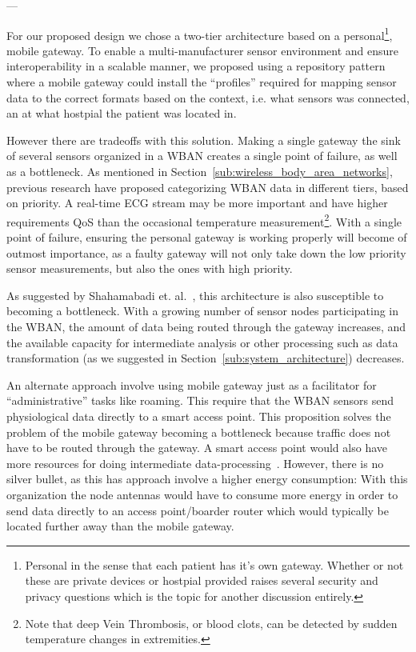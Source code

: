 ---

For our proposed design we chose a two-tier architecture based on a personal\footnote{ Personal in the sense that each patient has it's own gateway. Whether or not these are private devices or hostpial provided raises several security and privacy questions which is the topic for another discussion entirely.}, mobile gateway. To enable a multi-manufacturer sensor environment and ensure interoperability in a scalable manner, we proposed using a repository pattern where a mobile gateway could install the ``profiles'' required for mapping sensor data to the correct formats based on the context, i.e. what sensors was connected, an at what hostpial the patient was located in. 

However there are tradeoffs with this solution. Making a single gateway the sink of several sensors organized in a WBAN creates a single point of failure, as well as a bottleneck. As mentioned in Section~\ref{sub:wireless_body_area_networks}, previous research have proposed categorizing WBAN data in different tiers, based on priority. A real-time ECG stream may be more important and have higher requirements QoS than the occasional temperature measurement\footnote{ Note that deep Vein Thrombosis, or blood clots, can be detected by sudden temperature changes in extremities.}.  With a single point of failure, ensuring the personal gateway is working properly will become of outmost importance, as a faulty gateway will not only take down the low priority sensor measurements, but also the ones with high priority. 

As suggested by Shahamabadi et. al.~\cite{Shahamabadi:2013df}, this architecture is also susceptible to becoming a bottleneck. With a growing number of sensor nodes participating in the WBAN, the amount of data being routed through the gateway increases, and the available capacity for intermediate analysis or other processing such as data transformation (as we suggested in Section~\ref{sub:system_architecture}) decreases. 

An alternate approach involve using mobile gateway just as a facilitator for ``administrative'' tasks like roaming. This require that the WBAN sensors send physiological data directly to a smart access point. This proposition solves the problem of the mobile gateway becoming a bottleneck because traffic does not have to be routed through the gateway. A smart access point would also have more resources for doing intermediate data-processing~\cite{DrAmirMohammadRahmani:2014vx}. However, there is no silver bullet, as this has approach involve a higher energy consumption: With this organization the node antennas would have to consume more energy in order to send data directly to an access point/boarder router which would typically be located further away than the mobile gateway. 

